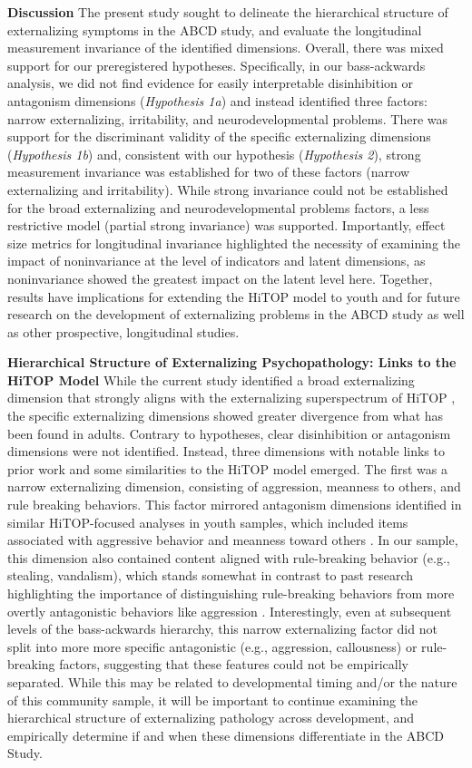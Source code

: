 \documentclass[
  20pt,
  number,
  preprint,
  3p,
  twocolumn]{elsarticle}
\begin{document}
\textbf{Discussion} The present study sought to delineate the
hierarchical structure of externalizing symptoms in the ABCD study, and
evaluate the longitudinal measurement invariance of the identified
dimensions. Overall, there was mixed support for our preregistered
hypotheses. Specifically, in our bass-ackwards analysis, we did not find
evidence for easily interpretable disinhibition or antagonism dimensions
(\emph{Hypothesis 1a}) and instead identified three factors: narrow
externalizing, irritability, and neurodevelopmental problems. There was
support for the discriminant validity of the specific externalizing
dimensions (\emph{Hypothesis 1b}) and, consistent with our hypothesis
(\emph{Hypothesis 2}), strong measurement invariance was established for
two of these factors (narrow externalizing and irritability). While
strong invariance could not be established for the broad externalizing
and neurodevelopmental problems factors, a less restrictive model
(partial strong invariance) was supported. Importantly, effect size
metrics for longitudinal invariance highlighted the necessity of
examining the impact of noninvariance at the level of indicators and
latent dimensions, as noninvariance showed the greatest impact on the
latent level here. Together, results have implications for extending the
HiTOP model to youth and for future research on the development of
externalizing problems in the ABCD study as well as other prospective,
longitudinal studies.

\textbf{Hierarchical Structure of Externalizing Psychopathology: Links
to the HiTOP Model} While the current study identified a broad
externalizing dimension that strongly aligns with the externalizing
superspectrum of HiTOP \citep{krueger2021}, the specific externalizing
dimensions showed greater divergence from what has been found in adults.
Contrary to hypotheses, clear disinhibition or antagonism dimensions
were not identified. Instead, three dimensions with notable links to
prior work and some similarities to the HiTOP model emerged. The first
was a narrow externalizing dimension, consisting of aggression, meanness
to others, and rule breaking behaviors. This factor mirrored antagonism
dimensions identified in similar HiTOP-focused analyses in youth
samples, which included items associated with aggressive behavior and
meanness toward others \citep{forbes2023}. In our sample, this dimension
also contained content aligned with rule-breaking behavior (e.g.,
stealing, vandalism), which stands somewhat in contrast to past research
highlighting the importance of distinguishing rule-breaking behaviors
from more overtly antagonistic behaviors like aggression
\citep{burt2012}. Interestingly, even at subsequent levels of the
bass-ackwards hierarchy, this narrow externalizing factor did not split
into more more specific antagonistic (e.g., aggression, callousness) or
rule-breaking factors, suggesting that these features could not be
empirically separated. While this may be related to developmental timing
and/or the nature of this community sample, it will be important to
continue examining the hierarchical structure of externalizing pathology
across development, and empirically determine if and when these
dimensions differentiate in the ABCD Study.
\end{document}
